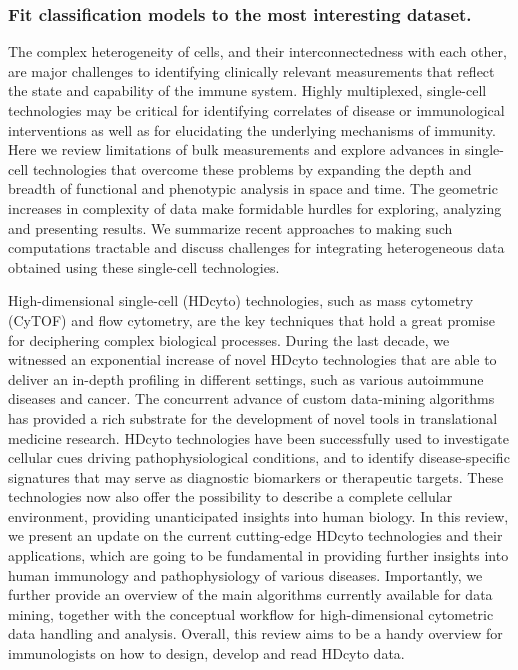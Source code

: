 \subsubsection{Fit classification models to the most interesting dataset.}

\citep{chattopadhyaySinglecellTechnologiesMonitoring2014}
The complex heterogeneity of cells, and their interconnectedness with each
other, are major challenges to identifying clinically relevant measurements
that reflect the state and capability of the immune system. Highly multiplexed,
single-cell technologies may be critical for identifying correlates of disease
or immunological interventions as well as for elucidating the underlying
mechanisms of immunity. Here we review limitations of bulk measurements and
explore advances in single-cell technologies that overcome these problems by
expanding the depth and breadth of functional and phenotypic analysis in space
and time. The geometric increases in complexity of data make formidable hurdles
for exploring, analyzing and presenting results. We summarize recent approaches
to making such computations tractable and discuss challenges for integrating
heterogeneous data obtained using these single-cell technologies.

\citep{galliEndOmicsHigh2019}
High-dimensional single-cell (HDcyto) technologies, such as mass cytometry
(CyTOF) and flow cytometry, are the key techniques that hold a great promise
for deciphering complex biological processes. During the last decade, we
witnessed an exponential increase of novel HDcyto technologies that are able to
deliver an in-depth profiling in different settings, such as various autoimmune
diseases and cancer. The concurrent advance of custom data-mining algorithms
has provided a rich substrate for the development of novel tools in
translational medicine research. HDcyto technologies have been successfully
used to investigate cellular cues driving pathophysiological conditions, and to
identify disease-specific signatures that may serve as diagnostic biomarkers or
therapeutic targets. These technologies now also offer the possibility to
describe a complete cellular environment, providing unanticipated insights into
human biology. In this review, we present an update on the current cutting-edge
HDcyto technologies and their applications, which are going to be fundamental
in providing further insights into human immunology and pathophysiology of
various diseases. Importantly, we further provide an overview of the main
algorithms currently available for data mining, together with the conceptual
workflow for high-dimensional cytometric data handling and analysis. Overall,
this review aims to be a handy overview for immunologists on how to design,
develop and read HDcyto data.


